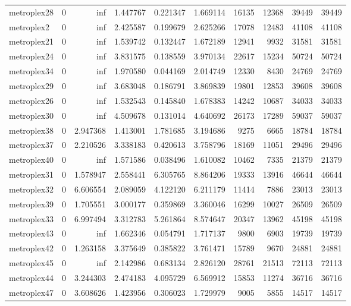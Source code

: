 \begin{longtable}{|l|r|r|r|r|r|r|r|r|r|}
metroplex28 & 0 & inf & 1.447767 & 0.221347 & 1.669114 & 16135 & 12368 & 39449 & 39449 \\
metroplex2 & 0 & inf & 2.425587 & 0.199679 & 2.625266 & 17078 & 12483 & 41108 & 41108 \\
metroplex21 & 0 & inf & 1.539742 & 0.132447 & 1.672189 & 12941 & 9932 & 31581 & 31581 \\
metroplex24 & 0 & inf & 3.831575 & 0.138559 & 3.970134 & 22617 & 15234 & 50724 & 50724 \\
metroplex34 & 0 & inf & 1.970580 & 0.044169 & 2.014749 & 12330 & 8430 & 24769 & 24769 \\
metroplex29 & 0 & inf & 3.683048 & 0.186791 & 3.869839 & 19801 & 12853 & 39608 & 39608 \\
metroplex26 & 0 & inf & 1.532543 & 0.145840 & 1.678383 & 14242 & 10687 & 34033 & 34033 \\
metroplex30 & 0 & inf & 4.509678 & 0.131014 & 4.640692 & 26173 & 17289 & 59037 & 59037 \\
metroplex38 & 0 & 2.947368 & 1.413001 & 1.781685 & 3.194686 & 9275 & 6665 & 18784 & 18784 \\
metroplex37 & 0 & 2.210526 & 3.338183 & 0.420613 & 3.758796 & 18169 & 11051 & 29496 & 29496 \\
metroplex40 & 0 & inf & 1.571586 & 0.038496 & 1.610082 & 10462 & 7335 & 21379 & 21379 \\
metroplex31 & 0 & 1.578947 & 2.558441 & 6.305765 & 8.864206 & 19333 & 13916 & 46644 & 46644 \\
metroplex32 & 0 & 6.606554 & 2.089059 & 4.122120 & 6.211179 & 11414 & 7886 & 23013 & 23013 \\
metroplex39 & 0 & 1.705551 & 3.000177 & 0.359869 & 3.360046 & 16299 & 10027 & 26509 & 26509 \\
metroplex33 & 0 & 6.997494 & 3.312783 & 5.261864 & 8.574647 & 20347 & 13962 & 45198 & 45198 \\
metroplex43 & 0 & inf & 1.662346 & 0.054791 & 1.717137 & 9800 & 6903 & 19739 & 19739 \\
metroplex42 & 0 & 1.263158 & 3.375649 & 0.385822 & 3.761471 & 15789 & 9670 & 24881 & 24881 \\
metroplex45 & 0 & inf & 2.142986 & 0.683134 & 2.826120 & 28761 & 21513 & 72113 & 72113 \\
metroplex44 & 0 & 3.244303 & 2.474183 & 4.095729 & 6.569912 & 15853 & 11274 & 36716 & 36716 \\
metroplex47 & 0 & 3.608626 & 1.423956 & 0.306023 & 1.729979 & 9005 & 5855 & 14517 & 14517 \\

\end{longtable}
